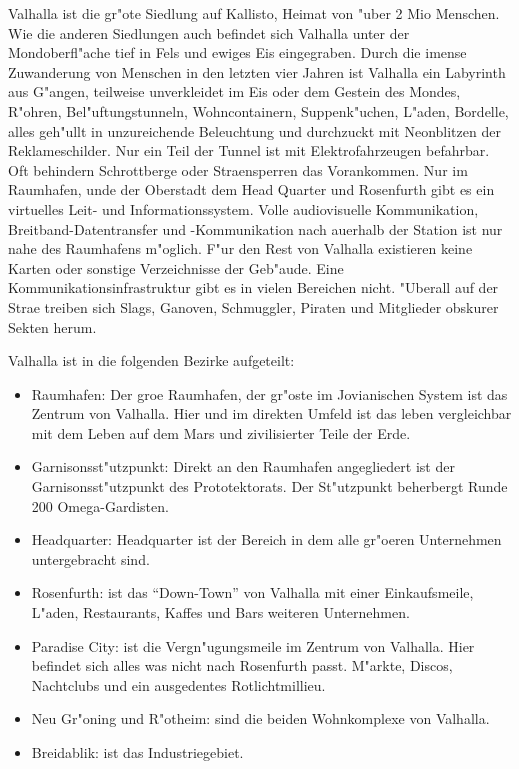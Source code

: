
Valhalla ist die gr"o\3te Siedlung auf Kallisto, Heimat von "uber 2 Mio Menschen. Wie die anderen Siedlungen auch befindet sich Valhalla unter der Mondoberfl"ache tief in Fels und ewiges Eis eingegraben. Durch die imense Zuwanderung von Menschen in den letzten vier Jahren ist Valhalla ein Labyrinth aus G"angen, teilweise unverkleidet im Eis oder dem Gestein des Mondes, R"ohren, Bel"uftungstunneln, Wohncontainern, Suppenk"uchen, L"aden, Bordelle, alles geh"ullt in unzureichende Beleuchtung und durchzuckt mit Neonblitzen der Reklameschilder. Nur ein Teil der Tunnel ist mit Elektrofahrzeugen befahrbar. Oft behindern Schrottberge oder Stra\3ensperren das Vorankommen. Nur im Raumhafen, unde der Oberstadt dem Head Quarter und Rosenfurth gibt es ein virtuelles Leit- und Informationssystem. Volle audiovisuelle Kommunikation, Breitband-Datentransfer und -Kommunikation nach au\3erhalb der Station ist nur nahe des Raumhafens m"oglich. F"ur den Rest von Valhalla existieren keine Karten oder sonstige Verzeichnisse der Geb"aude. Eine Kommunikationsinfrastruktur gibt es in vielen Bereichen nicht. "Uberall auf der Stra\3e treiben sich Slags, Ganoven, Schmuggler, Piraten  und Mitglieder obskurer Sekten herum.


Valhalla ist in die folgenden Bezirke aufgeteilt:

\begin{itemize}
    \item Raumhafen: Der gro\3e Raumhafen, der gr"oste im Jovianischen System ist das Zentrum von Valhalla. Hier und im direkten Umfeld ist das leben vergleichbar mit dem Leben auf dem Mars und zivilisierter Teile der Erde.
    \item Garnisonsst"utzpunkt: Direkt an den Raumhafen angegliedert ist der Garnisonsst"utzpunkt des Prototektorats. Der St"utzpunkt beherbergt Runde 200 Omega-Gardisten. 
    \item Headquarter: Headquarter ist der Bereich in dem alle gr"o\3eren Unternehmen untergebracht sind.
    \item Rosenfurth: ist das ``Down-Town'' von Valhalla mit einer Einkaufsmeile, L"aden, Restaurants, Kaffes und Bars weiteren Unternehmen.
    \item Paradise City: ist die Vergn"ugungsmeile im Zentrum von Valhalla. Hier befindet sich alles was nicht nach Rosenfurth passt. M"arkte, Discos, Nachtclubs und ein ausgedentes Rotlichtmillieu.
    \item Neu Gr"oning und R"otheim: sind die beiden Wohnkomplexe von Valhalla.
    \item Breidablik: ist das Industriegebiet.
\end{itemize}

